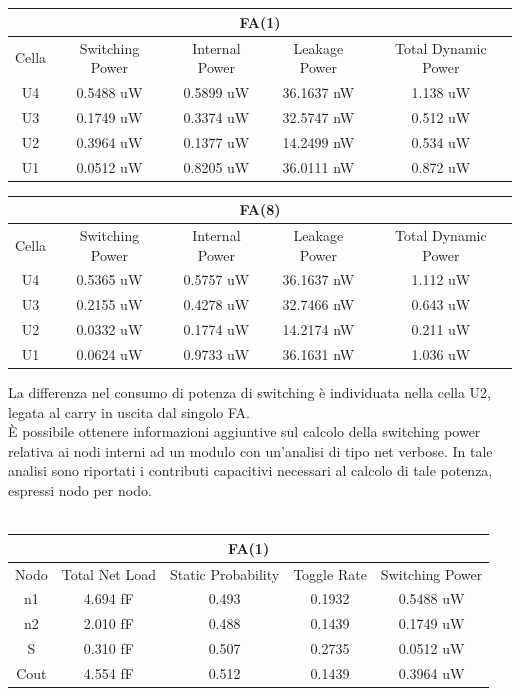 \documentclass[11pt,  english, makeidx, a4paper, titlepage, oneside]{book}
\begin{document}
\\\\
\begin{center}
	\begin{tabular}{|c|c|c|c|c|}
	\multicolumn{5}{c}{FA(1) }\\
	\hline
	Cella &  Switching Power & Internal Power & Leakage Power & Total Dynamic Power \\ 
	\hline
	U4 & 0.5488 uW & 0.5899 uW & 36.1637 nW & 1.138 uW  \\
	\hline
	U3 & 0.1749 uW & 0.3374 uW & 32.5747 nW & 0.512 uW  \\
	\hline
	U2 & 0.3964 uW & 0.1377 uW & 14.2499 nW & 0.534 uW  \\
	\hline
	U1 & 0.0512 uW & 0.8205 uW & 36.0111 nW & 0.872 uW  \\
	\hline
	\end{tabular}
\end{center}
\vspace{0.3cm}
\begin{center}
	\begin{tabular}{|c|c|c|c|c|}
	\multicolumn{5}{c}{FA(8) }\\
	\hline
	Cella &  Switching Power & Internal Power & Leakage Power & Total Dynamic Power \\ 
	\hline
	U4 & 0.5365 uW & 0.5757 uW & 36.1637 nW & 1.112 uW  \\
	\hline
	U3 & 0.2155 uW & 0.4278 uW & 32.7466 nW & 0.643 uW  \\
	\hline
	U2 & 0.0332 uW & 0.1774 uW & 14.2174 nW & 0.211 uW  \\
	\hline
	U1 & 0.0624 uW & 0.9733 uW & 36.1631 nW & 1.036 uW  \\
	\hline
	\end{tabular}
\end{center}
\vspace{0.3cm}
La differenza nel consumo di potenza di switching è individuata nella cella U2, legata al carry in uscita dal singolo FA.
\\
È possibile ottenere informazioni aggiuntive sul calcolo della switching power relativa ai nodi interni ad un modulo con un'analisi di tipo net verbose. In tale analisi sono riportati i contributi capacitivi necessari al calcolo di tale potenza, espressi nodo per nodo.
\\\\
\begin{center}
	\begin{tabular}{|c|c|c|c|c|}
	\multicolumn{5}{c}{FA(1) }\\
	\hline
	Nodo &  Total Net Load & Static Probability & Toggle Rate & Switching Power \\ 
	\hline
	n1 & 4.694 fF & 0.493 & 0.1932 & 0.5488 uW  \\
	\hline
	n2 & 2.010 fF & 0.488 & 0.1439 & 0.1749 uW  \\
	\hline
	S & 0.310 fF & 0.507 & 0.2735 & 0.0512 uW  \\
	\hline
	Cout & 4.554 fF & 0.512 &  0.1439 & 0.3964 uW  \\
	\hline
	\end{tabular}
\end{center}
\end{document}
